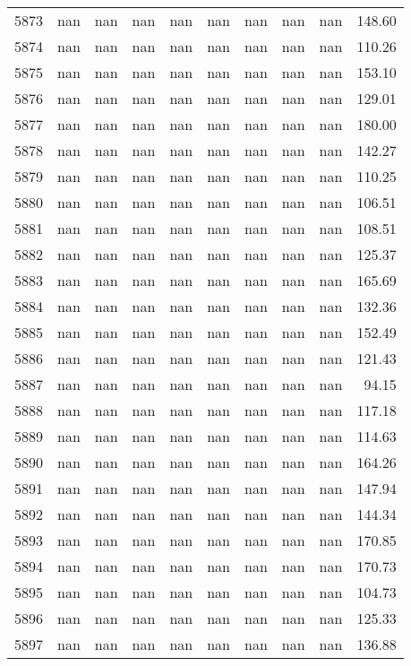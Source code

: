 \begin{tabular}{lrrrrrrrrr}
5873 & nan & nan & nan & nan & nan & nan & nan & nan & 148.60 \\
5874 & nan & nan & nan & nan & nan & nan & nan & nan & 110.26 \\
5875 & nan & nan & nan & nan & nan & nan & nan & nan & 153.10 \\
5876 & nan & nan & nan & nan & nan & nan & nan & nan & 129.01 \\
5877 & nan & nan & nan & nan & nan & nan & nan & nan & 180.00 \\
5878 & nan & nan & nan & nan & nan & nan & nan & nan & 142.27 \\
5879 & nan & nan & nan & nan & nan & nan & nan & nan & 110.25 \\
5880 & nan & nan & nan & nan & nan & nan & nan & nan & 106.51 \\
5881 & nan & nan & nan & nan & nan & nan & nan & nan & 108.51 \\
5882 & nan & nan & nan & nan & nan & nan & nan & nan & 125.37 \\
5883 & nan & nan & nan & nan & nan & nan & nan & nan & 165.69 \\
5884 & nan & nan & nan & nan & nan & nan & nan & nan & 132.36 \\
5885 & nan & nan & nan & nan & nan & nan & nan & nan & 152.49 \\
5886 & nan & nan & nan & nan & nan & nan & nan & nan & 121.43 \\
5887 & nan & nan & nan & nan & nan & nan & nan & nan & 94.15 \\
5888 & nan & nan & nan & nan & nan & nan & nan & nan & 117.18 \\
5889 & nan & nan & nan & nan & nan & nan & nan & nan & 114.63 \\
5890 & nan & nan & nan & nan & nan & nan & nan & nan & 164.26 \\
5891 & nan & nan & nan & nan & nan & nan & nan & nan & 147.94 \\
5892 & nan & nan & nan & nan & nan & nan & nan & nan & 144.34 \\
5893 & nan & nan & nan & nan & nan & nan & nan & nan & 170.85 \\
5894 & nan & nan & nan & nan & nan & nan & nan & nan & 170.73 \\
5895 & nan & nan & nan & nan & nan & nan & nan & nan & 104.73 \\
5896 & nan & nan & nan & nan & nan & nan & nan & nan & 125.33 \\
5897 & nan & nan & nan & nan & nan & nan & nan & nan & 136.88 \\

\end{tabular}
